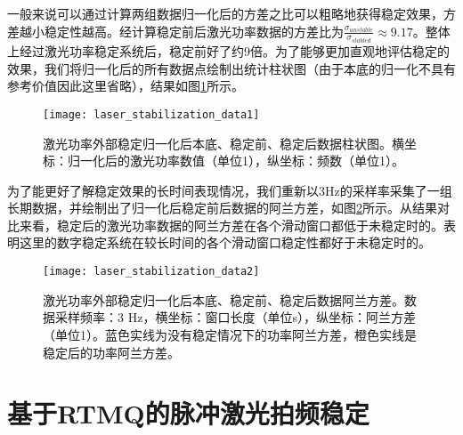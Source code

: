 一般来说可以通过计算两组数据归一化后的方差之比可以粗略地获得稳定效果，方差越小稳定性越高。经计算稳定前后激光功率数据的方差比为$\frac{\sigma_{unstable}}{\sigma_{stabled}}\approx 9.17$。整体上经过激光功率稳定系统后，稳定前好了约9倍。为了能够更加直观地评估稳定的效果，我们将归一化后的所有数据点绘制出统计柱状图（由于本底的归一化不具有参考价值因此这里省略），结果如图\ref{fig:laser_stabilization_data1}所示。
\begin{figure}
    \centering
    \caption[激光功率外部稳定柱状图对比数据]{激光功率外部稳定归一化后本底、稳定前、稳定后数据柱状图。横坐标：归一化后的激光功率数值（单位1），纵坐标：频数（单位1）。\label{fig:laser_stabilization_data1}}
    \texttt{[image: laser\_stabilization\_data1]}
\end{figure}

为了能更好了解稳定效果的长时间表现情况，我们重新以3Hz的采样率采集了一组长期数据，并绘制出了归一化后稳定前后数据的阿兰方差，如图\ref{fig:laser_stabilization_data2}所示。从结果对比来看，稳定后的激光功率数据的阿兰方差在各个滑动窗口都低于未稳定时的。表明这里的数字稳定系统在较长时间的各个滑动窗口稳定性都好于未稳定时的。
\begin{figure}
    \centering
    \caption[激光功率外部稳定阿兰方差对比数据]{激光功率外部稳定归一化后本底、稳定前、稳定后数据阿兰方差。数据采样频率：3 Hz，横坐标：窗口长度（单位s），纵坐标：阿兰方差（单位1）。蓝色实线为没有稳定情况下的功率阿兰方差，橙色实线是稳定后的功率阿兰方差。\label{fig:laser_stabilization_data2}}
    \texttt{[image: laser\_stabilization\_data2]}
\end{figure}










\newpage
\section[基于RTMQ的脉冲激光拍频稳定]{基于RTMQ的脉冲激光拍频稳定\label{section:pulsed_laser_locking}}

